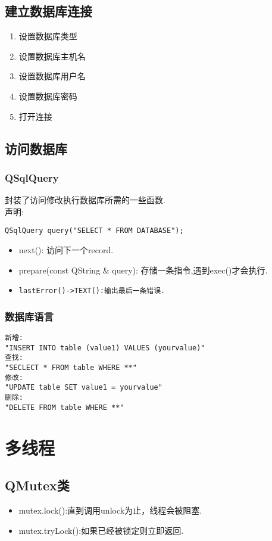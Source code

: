 \documentclass[11pt]{article}
\begin{document}
\subsection{建立数据库连接}
\begin{enumerate}
\item 设置数据库类型
\item 设置数据库主机名
\item 设置数据库用户名
\item 设置数据库密码
\item 打开连接
\end{enumerate}


\subsection{访问数据库}



\subsubsection{QSqlQuery}
封装了访问修改执行数据库所需的一些函数.\\
声明:
\begin{lstlisting}
QSqlQuery query("SELECT * FROM DATABASE");
\end{lstlisting}
\begin{itemize}
\item next(): 访问下一个record.
\item prepare(const QString \& query): 存储一条指令,遇到exec()才会执行.
\item \verb|lastError()->TEXT():输出最后一条错误.|
\end{itemize}

\subsubsection{数据库语言}
\begin{verbatim}
新增:
"INSERT INTO table (value1) VALUES (yourvalue)"
查找:
"SECLECT * FROM table WHERE **"
修改:
"UPDATE table SET value1 = yourvalue"
删除:
"DELETE FROM table WHERE **"
\end{verbatim}
\newpage


\section{多线程}
\subsection{QMutex类}
\begin{itemize}
\item mutex.lock():直到调用unlock为止，线程会被阻塞.
\item mutex.tryLock():如果已经被锁定则立即返回.
\end{itemize}
\end{document}
